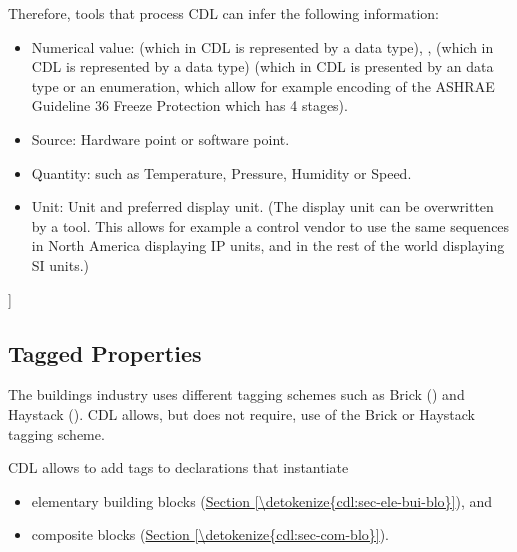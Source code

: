 \documentclass[letterpaper,10pt, openany,english]{sphinxmanual}
\begin{document}
Therefore, tools that process CDL can infer the following information:
\begin{itemize}
\item {} 
Numerical value:
{\hyperref[\detokenize{glossary:term-binary-value}]{}}
(which in CDL is represented by a  data type),
{\hyperref[\detokenize{glossary:term-analog-value}]{}},
(which in CDL is represented by a  data type)
{\hyperref[\detokenize{glossary:term-mode}]{}}
(which in CDL is presented by an  data type or an enumeration,
which allow for example encoding of the
ASHRAE Guideline 36 Freeze Protection which has 4 stages).

\item {} 
Source: Hardware point or software point.

\item {} 
Quantity: such as Temperature, Pressure, Humidity or Speed.

\item {} 
Unit: Unit and preferred display unit. (The display unit
can be overwritten by a tool. This allows for example a control vendor
to use the same sequences in North America displaying IP units, and in
the rest of the world displaying SI units.)

\end{itemize}

{]}


\subsection{Tagged Properties}
\label{\detokenize{cdl:tagged-properties}}\label{\detokenize{cdl:sec-tag-pro}}
The buildings industry uses different tagging schemes such as
Brick () and Haystack ().
CDL allows, but does not require, use of the Brick or Haystack tagging scheme.

CDL allows to add tags to declarations that instantiate
\begin{itemize}
\item {} 
elementary building blocks (\hyperref[\detokenize{cdl:sec-ele-bui-blo}]{Section \ref{\detokenize{cdl:sec-ele-bui-blo}}}), and

\item {} 
composite blocks (\hyperref[\detokenize{cdl:sec-com-blo}]{Section \ref{\detokenize{cdl:sec-com-blo}}}).

\end{itemize}
\end{document}
